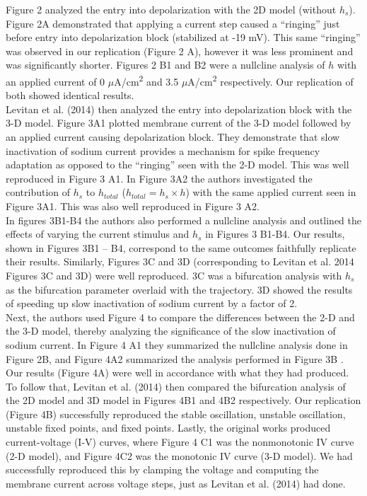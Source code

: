 Figure 2 analyzed the entry into depolarization with the 2D model (without $h_s$). Figure 2A demonstrated that applying a current step caused a “ringing” just before entry into depolarization block (stabilized at -19 mV). This same “ringing” was observed in our replication (Figure 2 A), however it was less prominent and was significantly shorter. Figures 2 B1 and B2 were a nullcline analysis of $h$ with an applied current of 0 $\mu$A/cm\textsuperscript{2} and 3.5 $\mu$A/cm\textsuperscript{2} respectively. Our replication of both showed identical results.\\ 

Levitan et al. (2014) then analyzed the entry into depolarization block with the 3-D model. Figure 3A1 plotted membrane current of the 3-D model followed by an applied current causing depolarization block. They demonstrate that slow inactivation of sodium current provides a mechanism for spike frequency adaptation as opposed to the “ringing” seen with the 2-D model. This was well reproduced in Figure 3 A1. In Figure 3A2 the authors investigated the contribution of $h_s$ to $h_{total}$ ($h_{total}= h_{s} \times h$) with the same applied current seen in Figure 3A1. This was also well reproduced in Figure 3 A2. \\

In figures 3B1-B4 the authors also performed a nullcline analysis and outlined the effects of varying the current stimulus and $h_s$ in Figures 3 B1-B4. Our results, shown in Figures 3B1 – B4, correspond to the same outcomes faithfully replicate their results. Similarly, Figures 3C and 3D (corresponding to Levitan et al. 2014 Figures 3C and 3D) were well reproduced. 3C was a bifurcation analysis with $h_s$ as the bifurcation parameter overlaid with the trajectory. 3D showed the results of speeding up slow inactivation of sodium current by a factor of 2.\\ 

Next, the authors used Figure 4 to compare the differences between the 2-D and the 3-D model, thereby analyzing the significance of the slow inactivation of sodium current. In Figure 4 A1 they summarized the nullcline analysis done in Figure 2B, and Figure 4A2 summarized the analysis performed in Figure 3B . Our results (Figure 4A) were well in accordance with what they had produced. To follow that, Levitan et al. (2014) then compared the bifurcation analysis of the 2D model and 3D model in Figures 4B1 and 4B2 respectively. Our replication (Figure 4B) successfully reproduced the stable oscillation, unstable oscillation, unstable fixed points, and fixed points. Lastly, the original works produced current-voltage (I-V) curves, where Figure 4 C1 was the nonmonotonic IV curve (2-D model), and Figure 4C2 was the monotonic IV curve (3-D model). We had successfully reproduced this by clamping the voltage and computing the membrane current across voltage steps, just as Levitan et al. (2014) had done.\\ 

